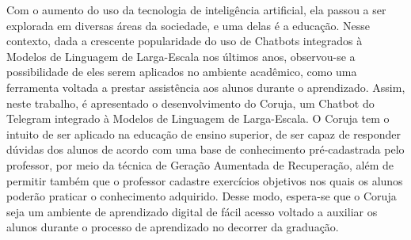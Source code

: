 Com o aumento do uso da tecnologia de inteligência artificial, ela passou a ser explorada em diversas áreas da sociedade, e uma delas é a educação. Nesse contexto, dada a crescente popularidade do uso de Chatbots integrados à Modelos de Linguagem de Larga-Escala nos últimos anos, observou-se a possibilidade de eles serem aplicados no ambiente acadêmico, como uma ferramenta voltada a prestar assistência aos alunos durante o aprendizado. Assim, neste trabalho, é apresentado o desenvolvimento do Coruja, um Chatbot do Telegram integrado à Modelos de Linguagem de Larga-Escala. O Coruja tem o intuito de ser aplicado na educação de ensino superior, de ser capaz de responder dúvidas dos alunos de acordo com uma base de conhecimento pré-cadastrada pelo professor, por meio da técnica de Geração Aumentada de Recuperação, além de permitir também que o professor cadastre exercícios objetivos nos quais os alunos poderão praticar o conhecimento adquirido. Desse modo, espera-se que o Coruja seja um ambiente de aprendizado digital de fácil acesso voltado a auxiliar os alunos durante o processo de aprendizado no decorrer da graduação.


